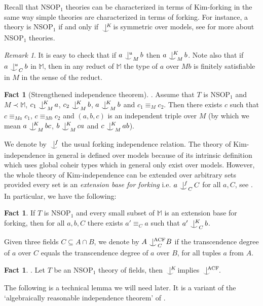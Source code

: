 \documentclass[psamsfonts]{amsart}
\theoremstyle{definition}
\newtheorem{fact}[thm]{Fact}
\theoremstyle{definition}
\theoremstyle{remark}
\newtheorem{remark}[thm]{Remark}
\numberwithin{equation}{section}
\newcommand\M{\mathbb{M}}
\newcommand{\ACF}{\mathrm{ACF}}
\def\seq{\subseteq}
\def\indi#1{\mathop{\ \ \hbox to 0ex{\hss$\vert^{\hbox to 0ex{$\scriptstyle#1$\hss}}$\hss}
\lower1ex\hbox to 0ex{\hss$\smile$\hss}\ \ }}
\begin{document}
Recall that NSOP$_1$ theories can be characterized in terms of Kim-forking in the same way simple theories are characterized in terms of forking. For instance, a theory is NSOP$_1$ if and only if $\indi K$ is symmetric over models, see \cite{KR20} for more about NSOP$_1$ theories.
\begin{remark}
    It is easy to check that if $a\indi u_M b$ then $a\indi K _M b$. Note also that if $a\indi u _C b$ in $\M$, then in any reduct of $\M$ the type of $a$ over $Mb$ is finitely satisfiable in $M$ in the sense of the reduct.
\end{remark}


\begin{fact}[Strengthened independence theorem] \cite[Theorem 2.13]{kruckmanramsey18}.
    Assume that $T$ is NSOP$_1$ and $M\prec \M$, $c_1\indi K_M a$, $c_2\indi K_M b$, $a\indi K_M b$ and $c_1\equiv_M c_2$. Then there exists $c$ such that $c\equiv_{Ma}c_1$, $c\equiv_{Mb} c_2$ and $(a,b,c)$ is an independent triple over $M$ (by which we mean $a\indi K_M bc$, $b\indi K_M ca$ and $c\indi K_M ab$).
\end{fact}

We denote by $\indi f$ the usual forking independence relation. The theory of Kim-independence in general is defined over models because of its intrinsic definition which uses global coheir types which in general only exist over models. However, the whole theory of Kim-independence can be extended over arbitrary sets provided every set is an \textit{extension base for forking} i.e. $a\indi f _C C$ for all $a,C$, see \cite{dobrowolskiKimramsey2022}. In particular, we have the following:
\begin{fact}
    If $T$ is NSOP$_1$ and every small subset of $\M$ is an extension base for forking, then for all $a,b,C$ there exists $a'\equiv_C a$ such that $a'\indi K_C b$.
\end{fact}


Given three fields $C\seq A\cap B$, we denote by $A\indi \ACF_C\ B$ if the transcendence degree of $a$ over $C$ equals the transcendence degree of $a$ over $B$, for all tuples $a$ from $A$.
\begin{fact}\cite[Proposition 9.28]{KR20} \cite{Chatzidakis_1999}.
    Let $T$ be an NSOP$_1$ theory of fields, then $\indi K$ implies $\indi \ACF\quad$.
\end{fact}

The following is a technical lemma we will need later.  It is a variant of the `algebraically reasonable independence theorem' of \cite{kruckmanramsey18}.  
\end{document}
